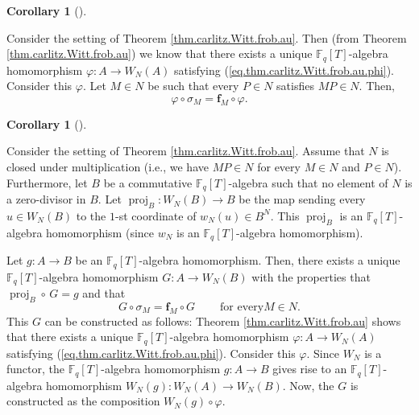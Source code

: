 \documentclass[numbers=enddot,12pt,final,onecolumn,notitlepage]{scrartcl}%
\theoremstyle{definition}
\newtheorem{coro}[theo]{Corollary}
\newenvironment{corollary}[1][]
{\begin{coro}[#1]\begin{leftbar}}
{\end{leftbar}\end{coro}}
\begin{document}
\begin{corollary}
\label{cor.carlitz.Witt.frob.au.preserves-frob}Consider the setting of Theorem
\ref{thm.carlitz.Witt.frob.au}. Then (from Theorem
\ref{thm.carlitz.Witt.frob.au}) we know that there exists a unique
$\mathbb{F}_{q}\left[  T\right]  $-algebra homomorphism $\varphi:A\rightarrow
W_{N}\left(  A\right)  $ satisfying (\ref{eq.thm.carlitz.Witt.frob.au.phi}).
Consider this $\varphi$. Let $M\in N$ be such that every $P\in N$ satisfies
$MP\in N$. Then,%
\[
\varphi\circ\sigma_{M}=\mathbf{f}_{M}\circ\varphi.
\]

\end{corollary}

\begin{corollary}
\label{cor.carlitz.Witt.frob.adjoint}Consider the setting of Theorem
\ref{thm.carlitz.Witt.frob.au}. Assume that $N$ is closed under multiplication
(i.e., we have $MP\in N$ for every $M\in N$ and $P\in N$). Furthermore, let
$B$ be a commutative $\mathbb{F}_{q}\left[  T\right]  $-algebra such that no
element of $N$ is a zero-divisor in $B$. Let $\operatorname*{proj}%
\nolimits_{B}:W_{N}\left(  B\right)  \rightarrow B$ be the map sending every
$u\in W_{N}\left(  B\right)  $ to the $1$-st coordinate of $w_{N}\left(
u\right)  \in B^{N}$. This $\operatorname*{proj}\nolimits_{B}$ is an
$\mathbb{F}_{q}\left[  T\right]  $-algebra homomorphism (since $w_{N}$ is an
$\mathbb{F}_{q}\left[  T\right]  $-algebra homomorphism).

Let $g:A\rightarrow B$ be an $\mathbb{F}_{q}\left[  T\right]  $-algebra
homomorphism. Then, there exists a unique $\mathbb{F}_{q}\left[  T\right]
$-algebra homomorphism $G:A\rightarrow W_{N}\left(  B\right)  $ with the
properties that $\operatorname*{proj}\nolimits_{B}\circ\,G=g$ and that%
\[
G\circ\sigma_{M}=\mathbf{f}_{M}\circ G\ \ \ \ \ \ \ \ \ \ \text{for every
}M\in N.
\]
This $G$ can be constructed as follows: Theorem \ref{thm.carlitz.Witt.frob.au}
shows that there exists a unique $\mathbb{F}_{q}\left[  T\right]  $-algebra
homomorphism $\varphi:A\rightarrow W_{N}\left(  A\right)  $ satisfying
(\ref{eq.thm.carlitz.Witt.frob.au.phi}). Consider this $\varphi$. Since
$W_{N}$ is a functor, the $\mathbb{F}_{q}\left[  T\right]  $-algebra
homomorphism $g:A\rightarrow B$ gives rise to an $\mathbb{F}_{q}\left[
T\right]  $-algebra homomorphism $W_{N}\left(  g\right)  :W_{N}\left(
A\right)  \rightarrow W_{N}\left(  B\right)  $. Now, the $G$ is constructed as
the composition $W_{N}\left(  g\right)  \circ\varphi$.
\end{corollary}
\end{document}
